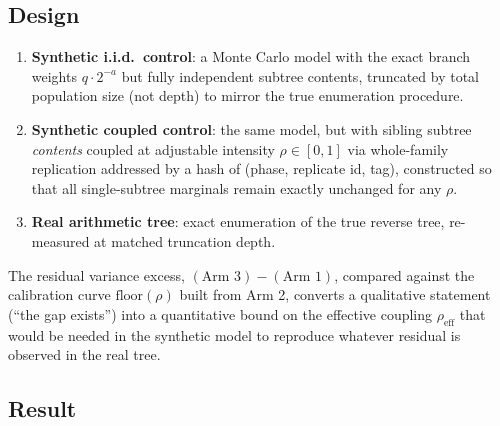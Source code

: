 \documentclass[11pt]{article}
\theoremstyle{definition}
\theoremstyle{remark}
\begin{document}
\subsection{Design}

\begin{enumerate}[label=Arm~\arabic*.]
\item \textbf{Synthetic i.i.d.\ control}: a Monte Carlo model with the
  exact branch weights $q\cdot 2^{-a}$ but fully independent
  subtree contents, truncated by total population size (not depth) to
  mirror the true enumeration procedure.
\item \textbf{Synthetic coupled control}: the same model, but with
  sibling subtree \emph{contents} coupled at adjustable intensity
  $\rho\in[0,1]$ via whole-family replication addressed by a hash of
  (phase, replicate id, tag), constructed so that all single-subtree
  marginals remain exactly unchanged for any $\rho$.
\item \textbf{Real arithmetic tree}: exact enumeration of the true
  reverse tree, re-measured at matched truncation depth.
\end{enumerate}

The residual variance excess, $(\text{Arm 3}) - (\text{Arm 1})$,
compared against the calibration curve $\text{floor}(\rho)$ built from
Arm 2, converts a qualitative statement (``the gap exists'') into a
quantitative bound on the effective coupling $\rho_{\mathrm{eff}}$ that
would be needed in the synthetic model to reproduce whatever residual
is observed in the real tree.

\subsection{Result}
\end{document}
